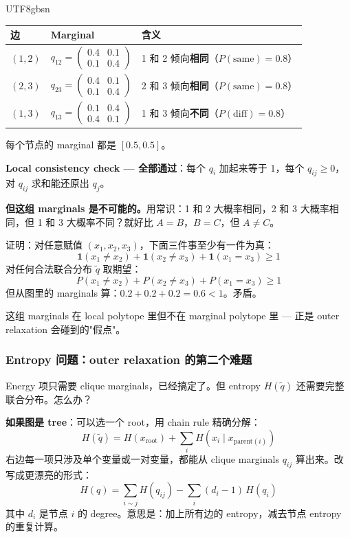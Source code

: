 \documentclass[11pt]{article}
\begin{document}
\begin{CJK}{UTF8}{gbsn}
\begin{center}
\begin{tabular}{l|l|l}
  边 & Marginal & 含义 \\
  \hline
  $(1,2)$ & $q_{12} = \begin{pmatrix} 0.4 & 0.1 \\ 0.1 & 0.4 \end{pmatrix}$ & 1 和 2 倾向\textbf{相同}（$P(\text{same}) = 0.8$）\\[6pt]
  $(2,3)$ & $q_{23} = \begin{pmatrix} 0.4 & 0.1 \\ 0.1 & 0.4 \end{pmatrix}$ & 2 和 3 倾向\textbf{相同}（$P(\text{same}) = 0.8$）\\[6pt]
  $(1,3)$ & $q_{13} = \begin{pmatrix} 0.1 & 0.4 \\ 0.4 & 0.1 \end{pmatrix}$ & 1 和 3 倾向\textbf{不同}（$P(\text{diff}) = 0.8$）\\
\end{tabular}
\end{center}

每个节点的 marginal 都是 $[0.5, 0.5]$。

\textbf{Local consistency check --- 全部通过}：每个 $q_i$ 加起来等于 1，每个 $q_{ij} \geq 0$，对 $q_{ij}$ 求和能还原出 $q_j$。

\textbf{但这组 marginals 是不可能的。}用常识：1 和 2 大概率相同，2 和 3 大概率相同，但 1 和 3 大概率不同？就好比 $A = B$，$B = C$，但 $A \neq C$。

证明：对任意赋值 $(x_1, x_2, x_3)$，下面三件事至少有一件为真：
\[
  \mathbf{1}(x_1 \neq x_2) + \mathbf{1}(x_2 \neq x_3) + \mathbf{1}(x_1 = x_3) \geq 1
\]
对任何合法联合分布 $\tilde{q}$ 取期望：
\[
  P(x_1 \neq x_2) + P(x_2 \neq x_3) + P(x_1 = x_3) \geq 1
\]
但从图里的 marginals 算：$0.2 + 0.2 + 0.2 = 0.6 < 1$。矛盾。

这组 marginals 在 local polytope 里但不在 marginal polytope 里 --- 正是 outer relaxation 会碰到的"假点"。

\subsubsection{Entropy 问题：outer relaxation 的第二个难题}

Energy 项只需要 clique marginals，已经搞定了。但 entropy $H(\tilde{q})$ 还需要完整联合分布。怎么办？

\textbf{如果图是 tree}：可以选一个 root，用 chain rule 精确分解：
\[
  H(\tilde{q}) = H(x_{\text{root}}) + \sum_i H(x_i \mid x_{\text{parent}(i)})
\]
右边每一项只涉及单个变量或一对变量，都能从 clique marginals $q_{ij}$ 算出来。改写成更漂亮的形式：
\[
  \boxed{H(q) = \sum_{i \sim j} H(q_{ij}) - \sum_i (d_i - 1)\, H(q_i)}
\]
其中 $d_i$ 是节点 $i$ 的 degree。意思是：加上所有边的 entropy，减去节点 entropy 的重复计算。


\end{CJK}
\end{document}
